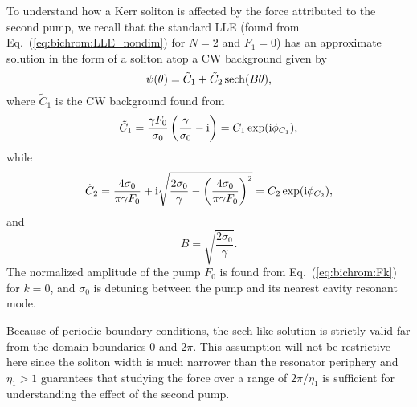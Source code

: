 To understand how a Kerr soliton is affected by the force attributed to the second pump, we recall that the standard LLE (found from Eq.~(\ref{eq:bichrom:LLE_nondim}) for $N = 2$ and $F_1 = 0$) has an approximate solution in the form of a soliton atop a CW background \cite{matsko2011modelocked, matsko2013timing, herr2014temporal} given by
%
\begin{equation}
\psi(\theta) = \tilde{C}_1 + \tilde{C}_2 \operatorname{sech} ( B \theta ),
\end{equation}
%
where $\tilde{C}_1$ is the CW background found from
%
\begin{equation}
\tilde{C}_1 = \frac{\gamma F_0}{\sigma_0} \left( \frac{\gamma}{\sigma_0} - \mathrm{i} \right) = C_1 \exp (\mathrm{i} \phi_{C_1}),
\end{equation}
%
while
%
\begin{equation}
\tilde{C}_2 = \frac{4 \sigma_0}{\pi \gamma F_0} + \mathrm{i} \sqrt{\frac{2 \sigma_0}{\gamma} - \left( \frac{4 \sigma_0}{\pi \gamma F_0} \right)^2} = C_2 \exp (\mathrm{i} \phi_{C_2}),
\end{equation}
%
and
%
\begin{equation}
B = \sqrt{\frac{2\sigma_0}{\gamma}}.
\end{equation}
%
The normalized amplitude of the pump $F_0$ is found from Eq.~(\ref{eq:bichrom:Fk}) for $k = 0$, and $\sigma_0$ is detuning between the pump and its nearest cavity resonant mode.

Because of periodic boundary conditions, the sech-like solution is strictly valid far from the domain boundaries 0 and $2\pi$. This assumption will not be restrictive here since the soliton width is much narrower than the resonator periphery and $\eta_1 > 1 $ guarantees that studying the force over a range of $2 \pi / \eta_1$ is sufficient for understanding the effect of the second pump.

